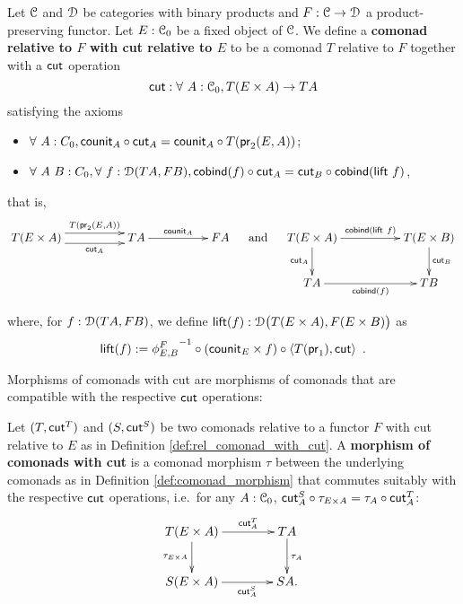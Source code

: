 \documentclass[a4paper,USenglish]{lipics}
\newcommand{\fat}[1]{\textbf{#1}}
\begin{document}
\begin{definition}%
\label{def:rel_comonad_with_cut}
 Let $\C$ and $\D$ be categories with binary products and $F:\C\to\D$ a product-preserving functor. Let $E:\C_0$ be a fixed object of $\C$.
 We define a \fat{comonad relative to $F$ with cut relative to $E$} to be a comonad $T$ relative to $F$ together with a $\cut$ operation 
    \[ \cut : \forall~A:\C_0, T(E\times A) \to TA \]
%   
 satisfying the axioms
  \begin{itemize}
   \item $\forall~A:C_0, \comp{\cut_A}{\counit_A} = \comp{T(\pr_2(E,A))}{\counit_{A}}$;
   \item $\forall~A~B:C_0,\forall~f:\D(TA,FB), \comp{\cut_A}{\cobind(f)} = \comp{\cobind(\extend~f)}{\cut_B}$,
  \end{itemize}
that is,
\[
 \begin{xy}
  \xymatrix@C=5em{
                T(E\times A) \ar@<1ex>[r]^-{T(\pr_2(E,A))} \ar@<-1ex>[r]_-{\cut_A} & TA \ar[r]^{\counit_A} & FA
  }
 \end{xy}
 \quad\text{ and } \quad
 \begin{xy}
  \xymatrix@C=5em{
	      T(E\times A) \ar[r]^{\cobind(\extend~f)} \ar[d]_{\cut_A} & T(E\times B) \ar[d]^{\cut_B} \\
	      TA \ar[r]_{\cobind(f)} &  TB 
  }
 \end{xy}
\]


  \noindent
  where, for $f:\D(TA,FB)$, we define $\extend(f) : \D\bigl(T(E\times A),F(E\times B)\bigr)$ as
       \[ \extend(f) := \comp{\comp{\langle T(\pr_1) , \cut \rangle}{(\counit_E\times f)}}{{\phi^{F}_{E,B}}^{-1}} \enspace . \]
  
\end{definition}

\noindent
Morphisms of comonads with cut are morphisms of comonads that are compatible with the respective $\cut$ operations:

\begin{definition}%
\label{def:morphism_comonad_cut}
 Let $(T,\cut^T)$ and $(S,\cut^S)$ be two comonads relative to a functor $F$ with cut relative to $E$ as in Definition \ref{def:rel_comonad_with_cut}.
 A \fat{morphism of comonads with cut} is a comonad morphism $\tau$ between the underlying comonads as in Definition \ref{def:comonad_morphism} that 
 commutes suitably with the respective $\cut$ operations, i.e.\ for any $A : \C_0$,
  $\comp{\tau_{E \times A}}{\cut^S_A}  = \comp{\cut^T_A}{\tau_A}$:
\[
 \begin{xy}
  \xymatrix@C=4em{
                 T(E\times A)   \ar[r]^-{\cut^T_A} \ar[d]_{\tau_{E \times A}}  & TA \ar[d]^{\tau_{A}}\\
                 S(E \times A)  \ar[r]_-{\cut^S_A}   & S A.
  }
 \end{xy}
\]

\end{definition}
\end{document}
